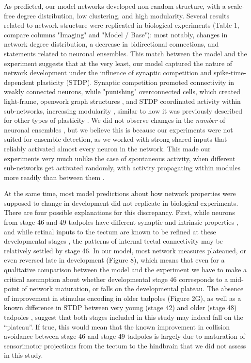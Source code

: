 \documentclass{article}
\begin{document}
As predicted, our model networks developed non-random structure, with a scale-free degree distribution, low clustering, and high modularity. Several results related to network structure were replicated in biological experiments (Table 1, compare columns "Imaging" and "Model / Base"): most notably, changes in network degree distribution, a decrease in bidirectional connections, and statements related to neuronal ensembles. This match between the model and the experiment suggests that at the very least, our model captured the nature of network development under the influence of synaptic competition and spike-time-dependent plasticity (STDP). Synaptic competition promoted connectivity in weakly connected neurons, while "punishing" overconnected cells, which created light-frame, openwork graph structures \citep{fiete2010chains}, and STDP coordinated activity within sub-networks, increasing modularity \citep{stam2010modular, litwin2014assemblies}, similar to how it was previously described for other types of plasticity \citep{damicelli2018topomod, triplett2018emergence}. We did not observe changes in the \textit{number} of neuronal ensembles \citep{avitan2017spontaneous, pietri2017emergence}, but we believe this is because our experiments were not suited for ensemble detection, as we worked with strong shared inputs that reliably activated almost every neuron in the network. This made our experiments very much unlike the case of spontaneous activity, when different sub-networks get activated randomly, with activity propagating within modules more readily than between them \citep{avitan2017spontaneous}.

At the same time, most model predictions about how network properties were supposed to change in development did not replicate in biological experiments. There are four possible explanations for this discrepancy. First, while neurons from stage 46 and 49 tadpoles have different synaptic and intrinsic properties \citep{ciarleglio2015}, and while retinal inputs to the tectum are known to be refined at these developmental stages \citep{tao2005refinement, munz2014hebbian}, the patterns of internal tectal connectivity may be relatively settled by stage 46. In our model, most network measures plateaued, or even reversed late in development (Figure 8), which means that even for a qualitative comparison between the model and the experiment we have to make a critical assumption about whether developmental stage 46 corresponds to a mid-point of network maturation, or falls on the developmental plateau. The absence of improvement in stimulus encoding in older tadpoles (Figure 2G), as well as a known difference in STDP between very young (stage 42) and older (stage 48) tadpoles \citep{richards2010stdp, tsui2010developmental}, suggest that both stages included in this study may indeed fall on the “plateau”. If true, this would mean that the known improvement in collision avoidance between stage 46 and stage 49 tadpoles \citep{dong2009} is largely due to maturation of sensorimotor projections from the tectum to the hindbrain that we did not assess in this study.
\end{document}
